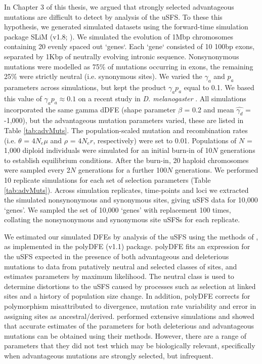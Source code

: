 \documentclass[11pt]{article}
\begin{document}
	In Chapter 3 of this thesis, we argued that strongly selected advantageous mutations are difficult to detect by analysis of the uSFS. To these this hypothesis, we generated simulated datasets using the forward-time simulation package SLiM (v1.8; \citealt{RN148}). We simulated the evolution of 1Mbp chromosomes containing 20 evenly spaced out `genes`. Each `gene` consisted of 10 100bp exons, separated by 1Kbp of neutrally evolving intronic sequence. Nonsynonymous mutations were modelled as 75\% of mutations occurring in exons, the remaining 25\% were strictly neutral (i.e. synonymous sites). We varied the $\gamma_a$ and $p_a$ parameters across simulations, but kept the product $\gamma_a p_a$ equal to 0.1. We based this value of $\gamma_a p_a \approx 0.1$ on a recent study in \textit{D. melanogaster} \citep{RN321}. All simulations incorporated the same gamma dDFE (shape parameter $\beta$ = 0.2 and mean $\hat{\gamma_d}$ = -1,000), but the advantageous mutation parameters varied, these are listed in Table \ref{tab:advMuts}. The population-scaled mutation and recombination rates (i.e. $\theta$ = \emph{$4N_{e}\mu$} and $\rho$ = \emph{$4N_{e}r$}, respectively) were set to 0.01. Populations of $N$ = 1,000 diploid individuals were simulated for an initial burn-in of 10$N$ generations to establish equilibrium conditions. After the burn-in, 20 haploid chromosomes were sampled every 2$N$ generations for a further 100$N$ generations. We performed 10 replicate simulations for each set of selection parameters (Table \ref{tab:advMuts}). Across simulation replicates, time-points and loci we extracted the simulated nonsynonymous and synonymous sites, giving uSFS data for 10,000 `genes'. We sampled the set of 10,000 `genes' with replacement 100 times, collating the nonsynonymous and synonymous site uSFSs for each replicate.
	
	We estimated our simulated DFEs by analysis of the uSFS using the methods of \cite{RN354}, as implemented in the polyDFE (v1.1) package. polyDFE fits an expression for the uSFS expected in the presence of both advantageous and deleterious mutations to data from putatively neutral and selected classes of sites, and estimates parameters by maximum likelihood. The neutral class is used to determine distortions to the uSFS caused by processes such as selection at linked sites and a history of population size change. In addition, polyDFE corrects for polymorphism misattributed to divergence, mutation rate variability and error in assigning sites as ancestral/derived. \cite{RN354} performed extensive simulations and showed that accurate estimates of the parameters for both deleterious and advantageous mutations can be obtained using their methods. However, there are a range of parameters that they did not test which may be biologically relevant, specifically when advantageous mutations are strongly selected, but infrequent.
\end{document}
